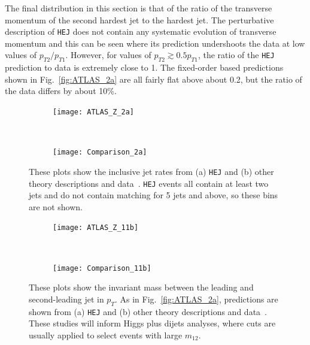 		The final distribution in this section is that of the ratio of the transverse
		momentum of the second hardest jet to the hardest jet.  The perturbative
		description of \texttt{HEJ} does not contain any systematic evolution of transverse
		momentum and this can be seen where its prediction undershoots the data at low
		values of $p_{T2}/p_{T1}$.  However, for values of $p_{T2} \gtrsim 0.5 p_{T1}$,
		the ratio of the \texttt{HEJ} prediction to data is extremely close to 1.  The
		fixed-order based predictions shown in Fig.~\eqref{fig:ATLAS_2a} are all fairly
		flat above about 0.2, but the ratio of the data differs by about 10\%.

		\newpage

		\begin{figure}[H]
		  \centering
		  \begin{subfigure}[b]{0.48\textwidth}
		    \texttt{[image: ATLAS\_Z\_2a]}
		    \label{fig:HEJ_ATLAS_2a}
		  \end{subfigure}
		  ~
		  \begin{subfigure}[b]{0.48\textwidth}
		    \texttt{[image: Comparison\_2a]}
		    \caption{}
		    \label{fig:MC_ATLAS_2a}
		  \end{subfigure}
		  \caption{These plots show the inclusive jet rates from (a) \texttt{HEJ} and (b) other
		    theory descriptions and data~\cite{Aad:2013ysa}.  \texttt{HEJ} events all contain at
		    least two jets and do not contain matching for 5 jets and above, so these
		    bins are not shown.}
		  \label{fig:ATLAS_2a}

		  \begin{subfigure}[b]{0.48\textwidth}
		    \texttt{[image: ATLAS\_Z\_11b]}
		    \caption{}
		    \label{fig:HEJ_ATLAS_11b}
		  \end{subfigure}
		  ~
		  \begin{subfigure}[b]{0.48\textwidth}
		    \texttt{[image: Comparison\_11b]}
		    \caption{}
		    \label{fig:MC_ATLAS_11b}
		  \end{subfigure}
		  \caption{These plots show the invariant mass between the leading and
		    second-leading jet in $p_T$.  As in Fig.~\eqref{fig:ATLAS_2a}, predictions are
		    shown from (a) \texttt{HEJ} and (b) other theory descriptions and
		    data~\cite{Aad:2013ysa}. These studies will inform Higgs plus dijets
		    analyses, where cuts are usually applied to select events with large
		    $m_{12}$.}
		  \label{fig:ATLAS_11b}
		\end{figure}

